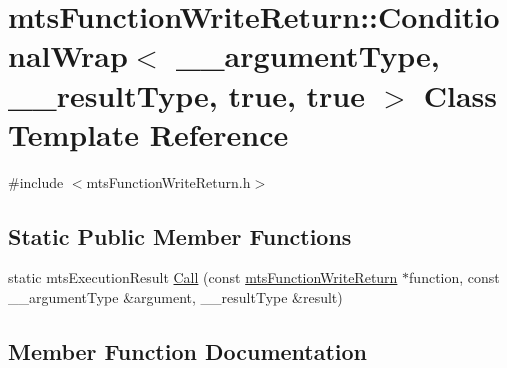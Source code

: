 \hypertarget{classmts_function_write_return_1_1_conditional_wrap_3_01____argument_type_00_01____result_type_00_01true_00_01true_01_4}{}\section{mts\+Function\+Write\+Return\+:\+:Conditional\+Wrap$<$ \+\_\+\+\_\+argument\+Type, \+\_\+\+\_\+result\+Type, true, true $>$ Class Template Reference}
\label{classmts_function_write_return_1_1_conditional_wrap_3_01____argument_type_00_01____result_type_00_01true_00_01true_01_4}


{\ttfamily \#include $<$mts\+Function\+Write\+Return.\+h$>$}

\subsection*{Static Public Member Functions}
\begin{DoxyCompactItemize}
\item 
static mts\+Execution\+Result \hyperlink{classmts_function_write_return_1_1_conditional_wrap_3_01____argument_type_00_01____result_type_00_01true_00_01true_01_4_a3128694605b92bc7233ae5b77e8de90c}{Call} (const \hyperlink{classmts_function_write_return}{mts\+Function\+Write\+Return} $\ast$function, const \+\_\+\+\_\+argument\+Type \&argument, \+\_\+\+\_\+result\+Type \&result)
\end{DoxyCompactItemize}


\subsection{Member Function Documentation}
\hypertarget{classmts_function_write_return_1_1_conditional_wrap_3_01____argument_type_00_01____result_type_00_01true_00_01true_01_4_a3128694605b92bc7233ae5b77e8de90c}{}
